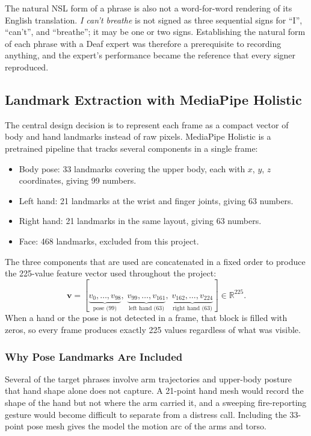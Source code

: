The natural NSL form of a phrase is also not a word-for-word rendering of its English translation. \textit{I can't breathe} is not signed as three sequential signs for ``I'', ``can't'', and ``breathe''; it may be one or two signs. Establishing the natural form of each phrase with a Deaf expert was therefore a prerequisite to recording anything, and the expert's performance became the reference that every signer reproduced.

\subsection{Landmark Extraction with MediaPipe Holistic}
The central design decision is to represent each frame as a compact vector of body and hand landmarks instead of raw pixels. MediaPipe Holistic \cite{zhang2020mediapipe, mediapipeholistic2020} is a pretrained pipeline that tracks several components in a single frame:

\begin{itemize}
    \item Body pose: 33 landmarks covering the upper body, each with $x$, $y$, $z$ coordinates, giving 99 numbers.
    \item Left hand: 21 landmarks at the wrist and finger joints, giving 63 numbers.
    \item Right hand: 21 landmarks in the same layout, giving 63 numbers.
    \item Face: 468 landmarks, excluded from this project.
\end{itemize}

\noindent The three components that are used are concatenated in a fixed order to produce the 225-value feature vector used throughout the project:
\[
    \mathbf{v} = [\underbrace{v_0,\dots,v_{98}}_{\text{pose (99)}},\;
                  \underbrace{v_{99},\dots,v_{161}}_{\text{left hand (63)}},\;
                  \underbrace{v_{162},\dots,v_{224}}_{\text{right hand (63)}}] \in \mathbb{R}^{225}.
\]
When a hand or the pose is not detected in a frame, that block is filled with zeros, so every frame produces exactly 225 values regardless of what was visible.

\subsubsection{Why Pose Landmarks Are Included}
Several of the target phrases involve arm trajectories and upper-body posture that hand shape alone does not capture. A 21-point hand mesh would record the shape of the hand but not where the arm carried it, and a sweeping fire-reporting gesture would become difficult to separate from a distress call. Including the 33-point pose mesh gives the model the motion arc of the arms and torso.

